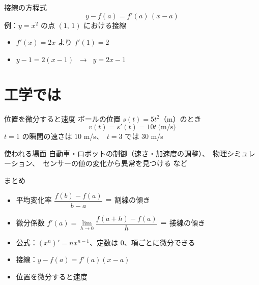 \documentclass[aspectratio=169]{beamer}
\begin{document}
\begin{frame}{接線の方程式}
  \[
    y - f(a) = f'(a)\,(x - a)
  \]
  \medskip
  例：$y = x^2$ の点 $(1,\,1)$ における接線
  \begin{itemize}
    \item $f'(x) = 2x$ より $f'(1) = 2$
    \item $y - 1 = 2(x - 1)$ \ → \ $y = 2x - 1$
  \end{itemize}
\end{frame}

\section{工学では}

\begin{frame}{位置を微分すると速度}
  \medskip
  ボールの位置 $s(t) = 5t^2$（m）のとき
  \[
    v(t) = s'(t) = 10t \ \text{(m/s)}
  \]
  $t = 1$ の瞬間の速さは $10$ m/s、\ $t = 3$ では $30$ m/s
  \begin{block}{使われる場面}
    自動車・ロボットの制御（速さ・加速度の調整）、\
    物理シミュレーション、\
    センサーの値の変化から異常を見つける など
  \end{block}
\end{frame}

\begin{frame}{まとめ}
  \begin{itemize}
    \item 平均変化率 $\dfrac{f(b) - f(a)}{b - a}$ ＝ 割線の傾き
    \item 微分係数 $f'(a) = \lim\limits_{h \to 0} \dfrac{f(a+h) - f(a)}{h}$ ＝ 接線の傾き
    \item 公式：$(x^n)' = n x^{n-1}$、定数は $0$、項ごとに微分できる
    \item 接線：$y - f(a) = f'(a)(x - a)$
    \item 位置を微分すると速度
  \end{itemize}
  \bigskip
\end{frame}
\end{document}
